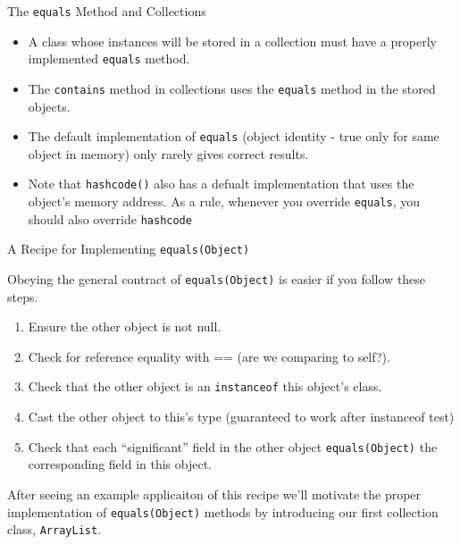 \documentclass{beamer}
\begin{document}
\begin{frame}[fragile]{The {\tt equals} Method and Collections}



\begin{itemize}
\item A class whose instances will be stored in a collection must have a properly implemented {\tt equals} method.
\item The {\tt contains} method in collections uses the {\tt equals} method in the stored objects.
\item The default implementation of {\tt equals} (object identity - true only for same object in memory) only rarely gives correct results.
\item Note that {\tt hashcode()} also has a defualt implementation that uses the object's memory address.  As a rule, whenever you override {\tt equals}, you should also override {\tt hashcode}
\end{itemize}


\end{frame}

\begin{frame}[fragile]{A Recipe for Implementing {\tt equals(Object)}}


Obeying the general contract of {\tt equals(Object)} is easier if you follow these steps.\\

\begin{enumerate}
\item Ensure the other object is not null.
\item Check for reference equality with == (are we comparing to self?).
\item Check that the other object is an {\tt instanceof} this object's class.
\item Cast the other object to this's type (guaranteed to work after instanceof test)
\item Check that each ``significant'' field in the other object {\tt equals(Object)} the corresponding field in this object.
\end{enumerate}

After seeing an example applicaiton of this recipe we'll motivate the proper implementation of {\tt equals(Object)} methods by introducing our first collection class, {\tt ArrayList}.

\end{frame}
\end{document}
